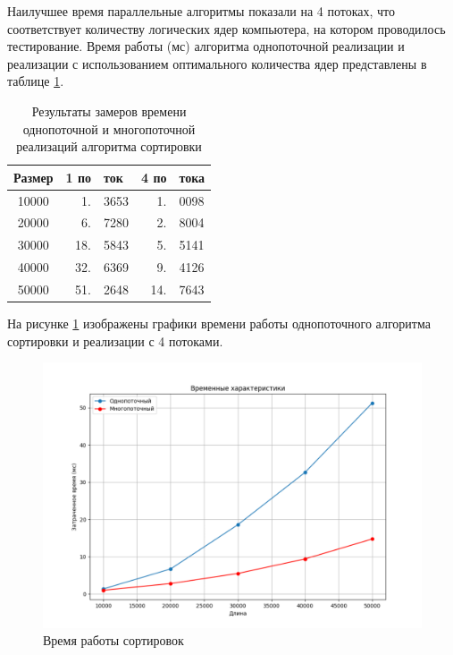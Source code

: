 Наилучшее время параллельные алгоритмы показали на 4 потоках, что соответствует количеству логических ядер компьютера, на котором проводилось тестирование. 
Время работы (мс) алгоритма однопоточной реализации и реализации с использованием оптимального количества ядер представлены в таблице \ref{tab:time2}.

\begin{table}[h]
	\begin{center}
		\caption{\label{tab:time2}Результаты замеров времени однопоточной и многопоточной реализаций алгоритма сортировки}
		\begin{tabular}{|c|r@{}l|r@{}l|}
		\hline
		Размер & 1 по&ток &  4 по&тока \\
		\hline
		10000 & 1.&3653 & 1.&0098 \\
		\hline
		20000 & 6.&7280 & 2.&8004 \\
		\hline
		30000 & 18.&5843 & 5.&5141 \\
		\hline
		40000 & 32.&6369 & 9.&4126 \\
		\hline
		50000 & 51.&2648 & 14.&7643 \\
		\hline
		\end{tabular}
	\end{center}
\end{table}

На рисунке \ref{fig:graph1} изображены графики времени работы однопоточного алгоритма сортировки и реализации с 4 потоками. 

\begin{figure}[h!]
	\centering
	\includegraphics[width=1\linewidth]{img/Plot2.png}
	\caption{Время работы сортировок}
	\label{fig:graph1}
\end{figure}

